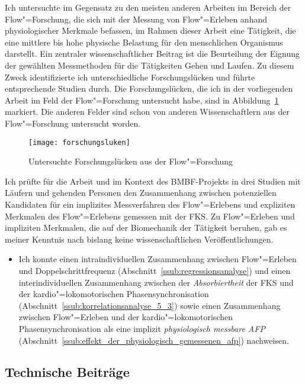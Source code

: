 Ich untersuchte im Gegensatz zu den meisten anderen Arbeiten im Bereich der Flow"=Forschung, die sich mit der Messung von Flow"=Erleben anhand physiologischer Merkmale befassen, im Rahmen dieser Arbeit eine Tätigkeit, die eine mittlere bis hohe physische Belastung für den menschlichen Organismus darstellt. Ein zentraler wissenschaftlicher Beitrag ist die Beurteilung der Eignung der gewählten Messmethoden für die Tätigkeiten Gehen und Laufen. Zu diesem Zweck identifizierte ich unterschiedliche Forschungslücken und führte entsprechende Studien durch. Die Forschungslücken, die ich in der vorliegenden Arbeit im Feld der Flow"=Forschung untersucht habe, sind in Abbildung~\ref{fig:forschungsluken} markiert. Die anderen Felder sind schon von anderen Wissenschaftlern aus der Flow"=Forschung untersucht worden. 
\begin{figure}
	[!htb] \centering 
	\texttt{[image: forschungsluken]} \caption[Untersuchte Forschungslücken aus der Flow"=Forschung]{Untersuchte Forschungslücken aus der Flow"=Forschung} \label{fig:forschungsluken} 
\end{figure}

Ich prüfte für die Arbeit und im Kontext des \acs{BMBF}-Projekts in drei Studien mit Läufern und gehenden Personen den Zusammenhang zwischen potenziellen Kandidaten für ein implizites Messverfahren des Flow"=Erlebens und expliziten Merkmalen des Flow"=Erlebens gemessen mit der \ac{FKS}. Zu Flow"=Erleben und impliziten Merkmalen, die auf der Biomechanik der Tätigkeit beruhen, gab es meiner Kenntnis nach bislang keine wissenschaftlichen Veröffentlichungen. 
\begin{itemize}
	
	\item Ich konnte einen intraindividuellen Zusammenhang zwischen Flow"=Erleben und Doppelschrittfrequenz (Abschnitt~\ref{ssub:regressionsanalyse}) und einen interindividuellen Zusammenhang zwischen der \emph{Absorbiertheit} der \ac{FKS} und der kardio"=lokomotorischen Phasensynchronisation (Abschnitt~\ref{ssub:korrelationsanalyse_5_3}) sowie einen Zusammenhang zwischen Flow"=Erleben und der kardio"=lokomotorischen Phasensynchronisation als eine implizit \emph{physiologisch messbare \ac{AFP}} (Abschnitt~\ref{ssub:effekt_der_physiologisch_gemessenen_afp}) nachweisen.  
\end{itemize}

\subsection{Technische Beiträge} 

